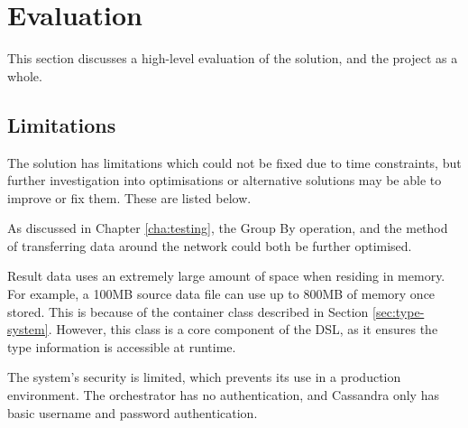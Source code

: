 \chapter{Evaluation}\label{cha:evaluation}
This section discusses a high-level evaluation of the solution, and the project as a whole.

\section{Limitations}
The solution has limitations which could not be fixed due to time constraints, but further investigation into optimisations or alternative solutions may be able to improve or fix them. These are listed below.

As discussed in Chapter \ref{cha:testing}, the Group By operation, and the method of transferring data around the network could both be further optimised.



Result data uses an extremely large amount of space when residing in memory. For example, a 100MB source data file can use up to 800MB of memory once stored. This is because of the container class described in Section \ref{sec:type-system}. However, this class is a core component of the DSL, as it ensures the type information is accessible at runtime.

The system's security is limited, which prevents its use in a production environment. The orchestrator has no authentication, and Cassandra only has basic username and password authentication.

